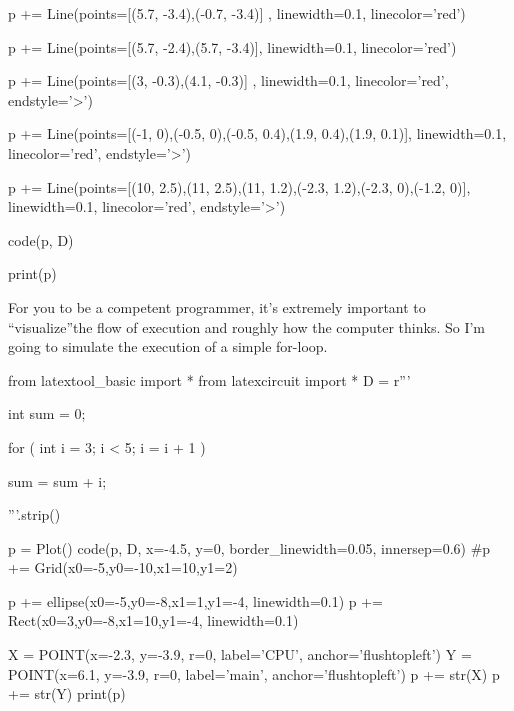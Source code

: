 \begin{python}
p += Line(points=[(5.7, -3.4),(-0.7, -3.4)] , linewidth=0.1, linecolor='red')

p += Line(points=[(5.7, -2.4),(5.7, -3.4)], linewidth=0.1, linecolor='red')

p += Line(points=[(3, -0.3),(4.1, -0.3)] , linewidth=0.1, linecolor='red', endstyle='>')

p += Line(points=[(-1, 0),(-0.5, 0),(-0.5, 0.4),(1.9, 0.4),(1.9, 0.1)], linewidth=0.1, linecolor='red', endstyle='>')

p += Line(points=[(10, 2.5),(11, 2.5),(11, 1.2),(-2.3, 1.2),(-2.3, 0),(-1.2, 0)], linewidth=0.1, linecolor='red', endstyle='>')


code(p, D)

print(p)
\end{python}

For you to be a competent programmer, it's extremely important to ``visualize''the flow of execution and roughly how the computer thinks. So I'm going to simulate the execution of a simple for-loop.

\begin{python}
from latextool_basic import *
from latexcircuit import *
D = r'''



int sum = 0;

    for ( int i = 3;     i < 5;     i = i + 1 )


        sum = sum + i;



'''.strip()

p = Plot()
code(p, D, x=-4.5, y=0, border_linewidth=0.05, innersep=0.6)
#p += Grid(x0=-5,y0=-10,x1=10,y1=2)

p += ellipse(x0=-5,y0=-8,x1=1,y1=-4, linewidth=0.1)
p += Rect(x0=3,y0=-8,x1=10,y1=-4, linewidth=0.1)

X = POINT(x=-2.3, y=-3.9, r=0, label='CPU', anchor='flushtopleft')
Y = POINT(x=6.1, y=-3.9, r=0, label='main', anchor='flushtopleft')
p += str(X)
p += str(Y)
print(p)
\end{python}

